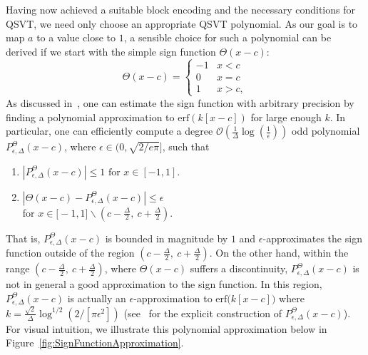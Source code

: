 \documentclass[aps,pra,showpacs,notitlepage,twocolumn,superscriptaddress,nofootinbib]{revtex4-1}
\begin{document}
    Having now achieved a suitable block encoding and the necessary conditions for QSVT, we need only choose an appropriate QSVT polynomial. As our goal is to map $a$ to a value close to $1$, a sensible choice for such a polynomial can be derived if we start with the simple sign function $\Theta(x-c)$:
        \begin{equation} \label{eq:sign_function}
            \Theta(x-c) =
            \begin{cases}
                -1 & x < c\\
                0 & x = c\\
                1 & x > c,
            \end{cases}
        \end{equation}
    As discussed in~\cite{low2017quantum, Gily_n_2019}, one can estimate the sign function with arbitrary precision by finding a polynomial approximation to $\text{erf}(k[x-c])$ for large enough $k$. In particular, one can efficiently compute a degree $\mathcal{O}\left(\frac{1}{\Delta}\log(\frac{1}{\epsilon})\right)$ odd polynomial $P^{\Theta}_{\epsilon,\Delta}(x-c)$, where $\epsilon \in \big( 0, \sqrt{2/e\pi} \big]$, such that
        \begin{enumerate}
            \item $|P^{\Theta}_{\epsilon,\Delta}(x-c)|\leq 1 \text{ for } x \in [-1,1]$.
            \item $|\Theta(x-c) - P^{\Theta}_{\epsilon,\Delta}(x-c)| \leq \epsilon$ \\ for $x \in \big[ -1,1 \big] \backslash \left(c-\frac{\Delta}{2}, \ c+\frac{\Delta}{2}\right)$.
        \end{enumerate}
    That is, $P^{\Theta}_{\epsilon,\Delta}(x-c)$ is bounded in magnitude by $1$ and $\epsilon$-approximates the sign function outside of the region $\left( c - \frac{\Delta}{2}, \ c + \frac{\Delta}{2} \right)$. On the other hand, within the range $\left( c - \frac{\Delta}{2}, \ c + \frac{\Delta}{2} \right)$, where $\Theta(x-c)$ suffers a discontinuity, $P^{\Theta}_{\epsilon,\Delta}(x-c)$ is not in general a good approximation to the sign function. In this region, $P^{\Theta}_{\epsilon,\Delta}(x-c)$ is actually an $\epsilon$-approximation to $\text{erf}\big(k[x-c] \big)$ where $k=\frac{\sqrt{2}}{\Delta} \log^{1/2}\left(2/[\pi \epsilon^2]\right)$ (see~\cite{low2017quantum} for the explicit construction of $P^{\Theta}_{\epsilon,\Delta}(x-c)$). For visual intuition, we illustrate this polynomial approximation below in Figure~\ref{fig:SignFunctionApproximation}.
    
\end{document}
